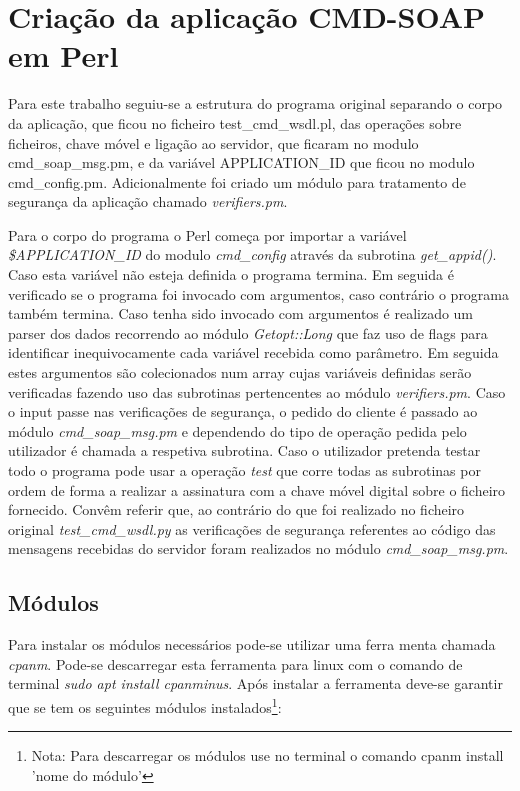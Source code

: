 \section{Criação da aplicação CMD-SOAP em Perl}

Para este trabalho seguiu-se a estrutura do programa original separando o corpo da aplicação, que ficou no ficheiro test\_cmd\_wsdl.pl, das operações sobre ficheiros, chave móvel e ligação ao servidor, que ficaram no modulo cmd\_soap\_msg.pm, e da variável APPLICATION\_ID que ficou no modulo cmd\_config.pm. Adicionalmente foi criado um módulo para tratamento de segurança da aplicação chamado \textit{verifiers.pm}.\newline


Para o corpo do programa o Perl começa por importar a variável \textit{\$APPLICATION\_ID} do modulo \textit{cmd\_config} através da subrotina \textit{get\_appid()}. Caso esta variável não esteja definida o programa termina. \newline
Em seguida é verificado se o programa foi invocado com argumentos, caso contrário o programa também termina. Caso tenha sido invocado com argumentos é realizado um parser dos dados recorrendo ao módulo \textit{Getopt::Long} que faz uso de flags para identificar inequivocamente cada variável recebida como parâmetro. Em seguida estes argumentos são colecionados num array cujas variáveis definidas serão verificadas fazendo uso das subrotinas pertencentes ao módulo \textit{verifiers.pm}.\newline
Caso o input passe nas verificações de segurança, o pedido do cliente é passado ao módulo \textit{cmd\_soap\_msg.pm} e dependendo do tipo de operação pedida pelo utilizador é chamada a respetiva subrotina. Caso o utilizador pretenda testar todo o programa pode usar a operação \textit{test} que corre todas as subrotinas por ordem de forma a realizar a assinatura com a chave móvel digital sobre o ficheiro fornecido.\newline
Convêm referir que, ao contrário do que foi realizado no ficheiro original \textit{test\_cmd\_wsdl.py} as verificações de segurança referentes ao código das mensagens recebidas do servidor foram realizados no módulo \textit{cmd\_soap\_msg.pm}.

\subsection{Módulos}

Para instalar os módulos necessários pode-se utilizar uma ferra menta chamada \textit{cpanm}. Pode-se descarregar esta ferramenta para linux com o comando de terminal \textit{sudo apt install cpanminus}.\newline
Após instalar a ferramenta deve-se garantir que se tem os seguintes módulos instalados\footnote{Nota: Para descarregar os módulos use no terminal o comando cpanm install 'nome do módulo'}:

